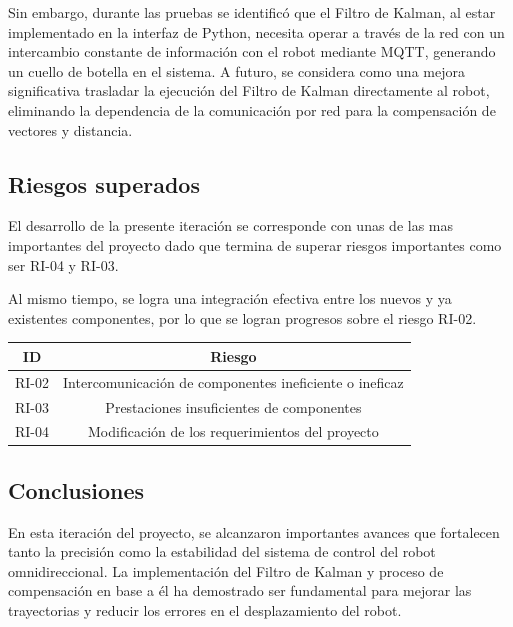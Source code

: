 Sin embargo, durante las pruebas se identificó que el Filtro de Kalman, al estar implementado en la interfaz de Python, necesita operar a través de la red con un intercambio constante de información con el robot mediante MQTT, generando un cuello de botella en el sistema. A futuro, se considera como una mejora significativa trasladar la ejecución del Filtro de Kalman directamente al robot, eliminando la dependencia de la comunicación por red para la compensación de vectores y distancia.

\subsection{Riesgos superados}
El desarrollo de la presente iteración se corresponde con unas de las mas importantes del proyecto dado que termina de superar riesgos importantes como ser RI-04 y RI-03.

Al mismo tiempo, se logra una integración efectiva entre los nuevos y ya existentes componentes, por lo que se logran progresos sobre el riesgo RI-02.

\begin{center} \begin{tabular}{|c|c|} 
    \hline \rowcolor{test_header_color}
        ID & Riesgo \\
    \hline
        RI-02 & Intercomunicación de componentes ineficiente o ineficaz \\
    \hline
        RI-03 & Prestaciones insuficientes de componentes \\
    \hline
        RI-04 & Modificación de los requerimientos del proyecto \\
    \hline
\end{tabular} \end{center}

\subsection{Conclusiones}
En esta iteración del proyecto, se alcanzaron importantes avances que fortalecen tanto la precisión como la estabilidad del sistema de control del robot omnidireccional. La implementación del Filtro de Kalman y proceso de compensación en base a él ha demostrado ser fundamental para mejorar las trayectorias y reducir los errores en el desplazamiento del robot.